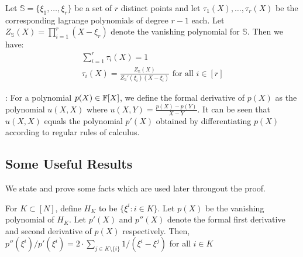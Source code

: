 \begin{fact}\label{fc:lagrange}
Let $\mathbb{S}=\{\xi_1,\ldots,\xi_r\}$ be a set of $r$ distinct points and let $\tau_1(X),\ldots,\tau_r(X)$ be
the corresponding lagrange polynomials of degree $r-1$ each. Let $Z_{\mathbb{S}}(X)=\prod_{i=1}^r (X-\xi_r)$ denote the vanishing polynomial
for $\mathbb{S}$. Then we have:
\begin{gather*}
    \sum_{i=1}^r \tau_i(X) = 1 \\
    \tau_i(X) = \frac{Z_{\mathbb{S}}(X)}{Z_{\mathbb{S}}'(\xi_i)(X-\xi_i)} \text{ for all } i\in [r]
\end{gather*}
\end{fact}

: For a polynomial $p(X) \in \mathbb{F}[X]$, we define the formal derivative of $p(X)$ as the polynomial
$u(X,X)$ where $u(X,Y)=\frac{p(X)-p(Y)}{X-Y}$. It can be seen that $u(X,X)$ equals the polynomial $p'(X)$ obtained by differentiating
$p(X)$ according to regular rules of calculus.

\subsection{Some Useful Results}\label{subsec:sub-results}
We state and prove some facts which are used later througout the proof.

\begin{lemma}\label{lem:sumtoder}
For $K\subset [N]$, define $H_K$ to be $\{\xi^i:i \in K\}$. Let $p(X)$ be the vanishing polynomial of $H_{K}$.
Let $p'(X)$ and $p''(X)$ denote the formal first derivative and second derivative of $p(X)$ respectively.
Then, $p''(\xi^i)/p'(\xi^i)=2 \cdot \sum_{j\in K\setminus \{i\}} 1/(\xi^i-\xi^j)$ for all $i \in K$
\end{lemma}

